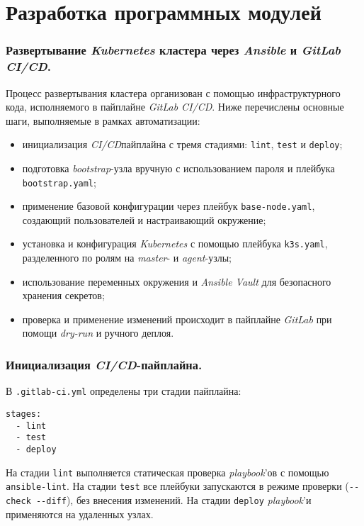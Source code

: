 \section{Разработка программных модулей}
\subsubsection{Развертывание \textit{Kubernetes} кластера через \textit{Ansible} и \textit{GitLab CI/CD}.} Процесс развертывания  кластера организован с помощью инфраструктурного кода, исполняемого в пайплайне \textit{GitLab CI/CD}. Ниже перечислены основные шаги, выполняемые в рамках автоматизации:

\begin{itemize}
  \item инициализация \textit{CI/CD}пайплайна с тремя стадиями: \lstinline{lint}, \lstinline{test} и \lstinline{deploy};
  \item подготовка \textit{bootstrap}-узла вручную с использованием пароля и плейбука \lstinline{bootstrap.yaml};
  \item применение базовой конфигурации через плейбук \lstinline{base-node.yaml}, создающий пользователей и настраивающий окружение;
  \item установка и конфигурация \textit{Kubernetes} с помощью плейбука \lstinline{k3s.yaml}, разделенного по ролям на \textit{master}- и \textit{agent}-узлы;
  \item использование переменных окружения и \textit{Ansible Vault} для безопасного хранения секретов;
  \item проверка и применение изменений происходит в пайплайне \textit{GitLab} при помощи \textit{dry-run} и ручного деплоя.
\end{itemize}

\subsubsection{Инициализация \textit{CI/CD}-пайплайна.} В \lstinline{.gitlab-ci.yml} определены три стадии пайплайна:

\begin{lstlisting}
stages:
  - lint
  - test
  - deploy
\end{lstlisting}

На стадии \lstinline{lint} выполняется статическая проверка \textit{playbook}'ов с помощью \lstinline{ansible-lint}. На стадии \lstinline{test} все плейбуки запускаются в режиме проверки (\lstinline{--check --diff}), без внесения изменений. На стадии \lstinline{deploy} \textit{playbook}'и применяются на удаленных узлах.

